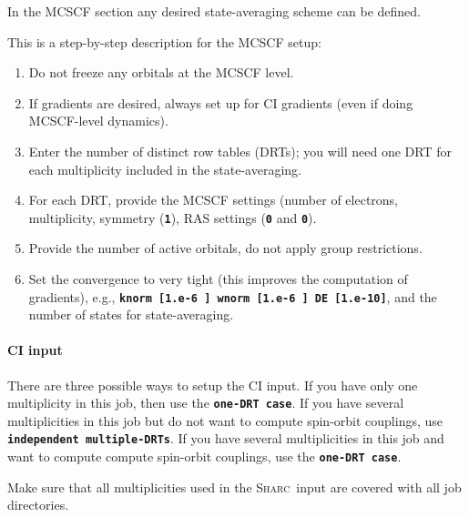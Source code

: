 \documentclass[a4paper,11pt,DIV=15,openany]{scrbook}
\newcommand{\sharc}{\textsc{Sharc}}
\newcommand{\ttt}[1]{\textbf{\texttt{#1}}}
\begin{document}
In the MCSCF section any desired state-averaging scheme can be defined. 

This is a step-by-step description for the MCSCF setup:
\begin{enumerate}
  \item Do not freeze any orbitals at the MCSCF level.
  \item If gradients are desired, always set up for CI gradients (even if doing MCSCF-level dynamics).
  \item Enter the number of distinct row tables (DRTs); you will need one DRT for each multiplicity included in the state-averaging.
  \item For each DRT, provide the MCSCF settings (number of electrons, multiplicity, symmetry (\ttt{1}), RAS settings (\ttt{0} and \ttt{0}).
  \item Provide the number of active orbitals, do not apply group restrictions.
  \item Set the convergence to very tight (this improves the computation of gradients), e.g., \ttt{knorm [1.e-6 ]  wnorm [1.e-6 ]  DE [1.e-10]}, and the number of states for state-averaging.
\end{enumerate}

\paragraph{CI input}

There are three possible ways to setup the CI input.
If you have only one multiplicity in this job, then use the \ttt{one-DRT case}.
If you have several multiplicities in this job but do not want to compute spin-orbit couplings, use \ttt{independent multiple-DRTs}.
If you have several multiplicities in this job and want to compute compute spin-orbit couplings, use the \ttt{one-DRT case}.

Make sure that all multiplicities used in the \sharc\ input are covered with all job directories.
\end{document}
